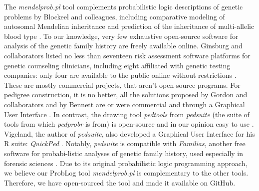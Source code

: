 \documentclass{eptcs}
\begin{document}
The \textit{mendelprob.pl} tool complements probabilistic logic descriptions of genetic problems by Blockeel and colleagues, including comparative modeling of autosomal Mendelian inheritance \cite{blockeel_probabilistic_2004} and prediction of the inheritance of multi-allelic blood type \cite{meert_cp_logic_2010}. To our knowledge, very few exhaustive open-source software for analysis of the genetic family history are freely available online. Ginsburg and collaborators listed no less than seventeen risk assessment software platforms for genetic counseling clinicians, including eight affiliated with genetic testing companies: only four are available to the public online without restrictions \cite{ginsburg_family_2019}. These are mostly commercial projects, that aren't open-source programs. For pedigree construction, it is no better, all the solutions proposed by Gordon and collaborators and by Bennett are or were commercial and through a Graphical User Interface \cite{gordon_future_2018, bennett_practical_2011}. In contrast, the drawing tool \textit{pedtools} from \textit{pedsuite} (the suite of tools from which \textit{pedprobr} is from) is open-source and in our opinion easy to use \cite{vigeland_pedigree_2021}. Vigeland, the author of \textit{pedsuite}, also developed a Graphical User Interface for his R suite: \textit{QuickPed} \cite{vigeland_quickped_2022}. Notably, \textit{pedsuite} is compatible with \textit{Familias}, another free software for probabi-\linebreak[4]listic analyses of genetic family history, used especially in forensic sciences \cite{kling_familias_2014}. Due to its original probabilistic logic programming approach, we believe our ProbLog tool \textit{mendelprob.pl} is complementary to the other tools. Therefore, we have open-sourced the tool and made it available on GitHub.
\end{document}
